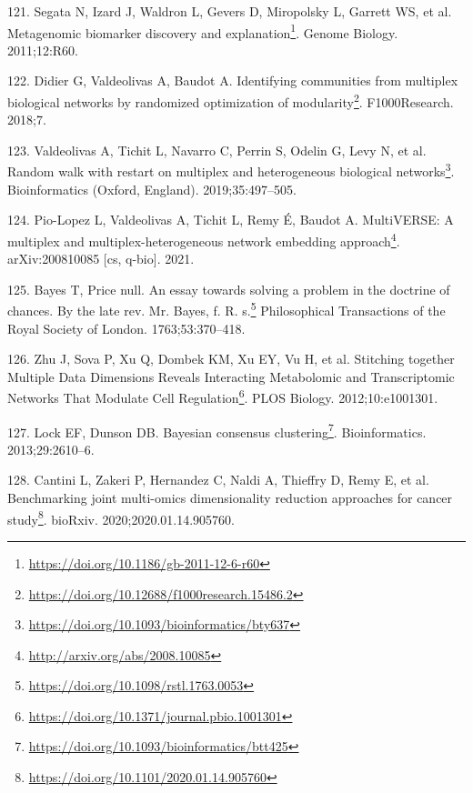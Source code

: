 \documentclass[
  a4paper,
]{book}
\DeclareRobustCommand{\href}[2]{#2\footnote{\url{#1}}}
\newlength{\cslhangindent}
\newlength{\cslentryspacingunit} %
\newenvironment{CSLReferences}[2] %
 {%
  \setlength{\parindent}{0pt}
  \ifodd #1
  \let\oldpar\par
  \def\par{\hangindent=\cslhangindent\oldpar}
  \fi
  \setlength{\parskip}{#2\cslentryspacingunit}
 }%
 {}
\begin{document}
\begin{CSLReferences}{0}{0}
\leavevmode{}%
121. Segata N, Izard J, Waldron L, Gevers D, Miropolsky L, Garrett WS, et al. \href{https://doi.org/10.1186/gb-2011-12-6-r60}{Metagenomic biomarker discovery and explanation}. Genome Biology. 2011;12:R60.

\leavevmode{}%
122. Didier G, Valdeolivas A, Baudot A. \href{https://doi.org/10.12688/f1000research.15486.2}{Identifying communities from multiplex biological networks by randomized optimization of modularity}. F1000Research. 2018;7.

\leavevmode{}%
123. Valdeolivas A, Tichit L, Navarro C, Perrin S, Odelin G, Levy N, et al. \href{https://doi.org/10.1093/bioinformatics/bty637}{Random walk with restart on multiplex and heterogeneous biological networks}. Bioinformatics (Oxford, England). 2019;35:497--505.

\leavevmode{}%
124. Pio-Lopez L, Valdeolivas A, Tichit L, Remy É, Baudot A. \href{http://arxiv.org/abs/2008.10085}{MultiVERSE: A multiplex and multiplex-heterogeneous network embedding approach}. arXiv:200810085 {[}cs, q-bio{]}. 2021.

\leavevmode{}%
125. Bayes T, Price null. \href{https://doi.org/10.1098/rstl.1763.0053}{An essay towards solving a problem in the doctrine of chances. By the late rev. Mr. Bayes, f. R. s.} Philosophical Transactions of the Royal Society of London. 1763;53:370--418.

\leavevmode{}%
126. Zhu J, Sova P, Xu Q, Dombek KM, Xu EY, Vu H, et al. \href{https://doi.org/10.1371/journal.pbio.1001301}{Stitching together Multiple Data Dimensions Reveals Interacting Metabolomic and Transcriptomic Networks That Modulate Cell Regulation}. PLOS Biology. 2012;10:e1001301.

\leavevmode{}%
127. Lock EF, Dunson DB. \href{https://doi.org/10.1093/bioinformatics/btt425}{Bayesian consensus clustering}. Bioinformatics. 2013;29:2610--6.

\leavevmode{}%
128. Cantini L, Zakeri P, Hernandez C, Naldi A, Thieffry D, Remy E, et al. \href{https://doi.org/10.1101/2020.01.14.905760}{Benchmarking joint multi-omics dimensionality reduction approaches for cancer study}. bioRxiv. 2020;2020.01.14.905760.


\end{CSLReferences}
\end{document}
